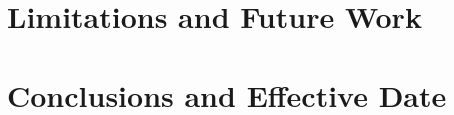 \documentclass[11pt]{article}
\begin{document}
\section{Limitations and Future Work}
\label{sec:limitations}


\section{Conclusions and Effective Date}
\label{sec:conclusions}


\clearpage
{}
{}
\begingroup
\raggedright
\nocite{*}


\endgroup

\clearpage

\end{document}
